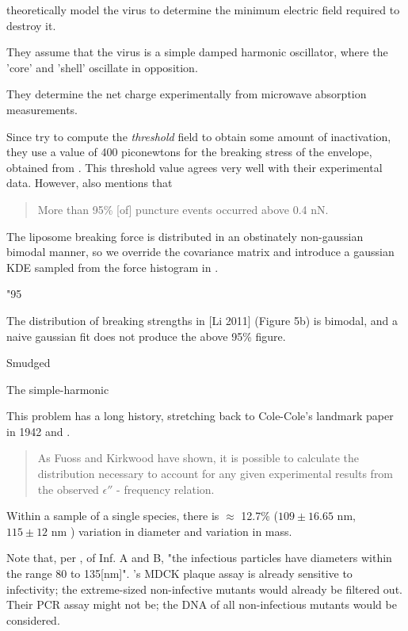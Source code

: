 \documentclass[paper.tex]{subfiles}
\begin{document}
	
	

\cite{Efficient2015} theoretically model the virus to determine the minimum electric field required to destroy it. 

They assume that the virus is a simple damped harmonic oscillator, where the 'core' and 'shell' oscillate in opposition. 

They determine the net charge experimentally from microwave absorption measurements.

Since \cite{Efficient2015} try to compute the {\it threshold} field to obtain some amount of inactivation, they use a value of 400 piconewtons for the breaking stress of the envelope, obtained from \cite{Bending2011}. This threshold value agrees very well with their experimental data. However, \cite{Bending2011} also mentions that 

\begin{quote}
	More than 95\% [of] puncture events occurred above 0.4 nN.
\end{quote}



The liposome breaking force is distributed in an obstinately non-gaussian bimodal manner, so we override the covariance matrix and introduce a gaussian KDE sampled from the force histogram in \cite{Bending2011}.



"95%

The distribution of breaking strengths in [Li 2011] (Figure 5b) is bimodal, and a naive gaussian fit does not produce the above 95\% figure.

Smudged 



The simple-harmonic

This problem has a long history, stretching back to Cole-Cole's landmark paper in 1942\cite{Dispersion1941} and \cite{Electrical1941}.

\begin{quote}
	As Fuoss and Kirkwood have shown, it is possible to calculate the distribution necessary to account for any given experimental results from the observed $\epsilon''$ - frequency relation.
\end{quote}

Within a sample of a single species, there is $\approx$ 12.7\%  ($109 \pm 16.65 \text{ nm}$\cite{lauffer1944biophysical}, $115 \pm 12 \text{ nm}$ \cite{Characterization1984}) variation in diameter and  \cite{Characterization1984} variation in mass.

Note that, per \cite{lauffer1944biophysical}, of Inf. A and B, "the infectious particles have diameters within the range 80 to 135[nm]". \cite{Efficient2015}'s MDCK plaque assay is already sensitive to infectivity; the extreme-sized non-infective mutants would already be filtered out. Their PCR assay might not be; the DNA of all non-infectious mutants would be considered.
\end{document}

